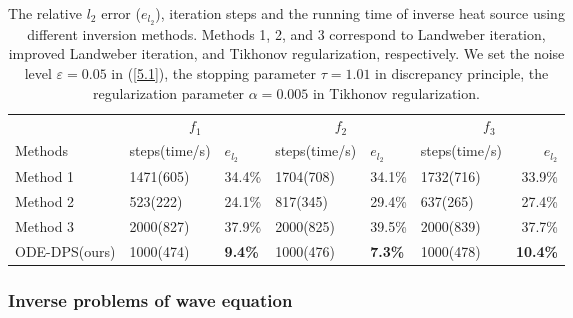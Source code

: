 \documentclass[mathserif,envcountsect,compress,8pt]{beamer}
\begin{document}
\begin{frame}
	\setlength{\parskip}{0.6\baselineskip}
	
	\begin{table}[ht]
		\begin{center}
			\begin{tabular}{llllllr}
				\toprule[1.pt]
				              & \multicolumn{2}{c}{$f_1$} & \multicolumn{2}{c}{$f_2$} & \multicolumn{2}{c}{$f_3$}                                                    \\
				\cline{2-3} \cline{4-5} \cline{6-7}
				Methods       & steps(time/s)             & $e_{l_2}$                 & steps(time/s)             & $e_{l_2}$      & steps(time/s) & $e_{l_2}$       \\ \hline
				Method 1      & 1471(605)                 & 34.4\%                    & 1704(708)                 & 34.1\%         & 1732(716)     & 33.9\%          \\
				Method 2      & 523(222)                  & 24.1\%                    & 817(345)                  & 29.4\%         & 637(265)      & 27.4\%          \\
				Method 3      & 2000(827)                 & 37.9\%                    & 2000(825)                 & 39.5\%         & 2000(839)     & 37.7\%          \\
				ODE-DPS(ours) & 1000(474)                 & \textbf{ 9.4\%}           & 1000(476)                 & \textbf{7.3\%} & 1000(478)     & \textbf{10.4\%} \\
				\bottomrule[1.0pt]
			\end{tabular}
		\end{center}
		\caption{The relative $l_2$ error ($e_{l_2}$), iteration steps and the running time of inverse heat source using different inversion methods. Methods 1, 2, and 3 correspond to Landweber iteration, improved Landweber iteration, and Tikhonov regularization, respectively. We set the noise level $\varepsilon=0.05$ in (\ref{5.1}), the stopping parameter $\tau=1.01$ in discrepancy principle, the regularization parameter $\alpha=0.005$ in Tikhonov regularization.}
		\label{heat_source_table}
	\end{table}
\end{frame}

\subsubsection{Inverse problems of wave equation}
\end{document}
